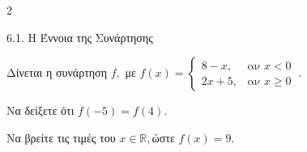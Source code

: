\begin{ylh}{2}
    \item 6.1. Η Έννοια της Συνάρτησης
\end{ylh}
Δίνεται η συνάρτηση $f,$ με \(f(x) = \left\{ \begin{matrix}
8 - x, & \text{αν }x < 0 \\
2x + 5, & \text{αν }x \geq 0
\end{matrix} \right.\ .\)

\begin{alist}
\item Να δείξετε ότι $f( - 5) = f(4).$
\item Να βρείτε τις τιμές του $x\mathbb{\in R,}$ώστε $f(x) = 9.$
\end{alist}

